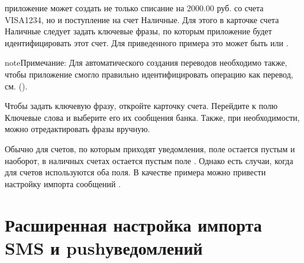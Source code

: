 \documentclass[a4paper,10pt,russian]{sphinxmanual}
\begin{document}
\sphinxAtStartPar
приложение может создать не только списание на 2000.00 руб. со счета VISA1234, но и поступление на счет Наличные. Для этого в карточке
счета Наличные следует задать ключевые фразы, по которым приложение будет идентифицировать этот счет. Для приведенного примера
это может быть  или .

\begin{sphinxadmonition}{note}{Примечание:}
\sphinxAtStartPar
Для автоматического создания переводов необходимо также, чтобы приложение смогло правильно идентифицировать операцию как перевод, см. {\hyperref[\detokenize{notifications:chapter-notifications}]{}} ().
\end{sphinxadmonition}

\sphinxAtStartPar
Чтобы задать ключевую фразу, откройте карточку счета. Перейдите к полю Ключевые слова и выберите его их сообщения банка. Также, при необходимости, можно отредактировать фразы вручную.

\noindent{}
\noindent{}
\noindent{}

\sphinxAtStartPar
Обычно для счетов, по которым приходят уведомления, поле  остается пустым и наоборот, в наличных счетах
остается пустым поле . Однако есть случаи, когда для счетов используются оба поля. В качестве примера можно привести настройку
импорта сообщений .

\sphinxstepscope


\chapter{Расширенная настройка импорта SMS и push\sphinxhyphen{}уведомлений}
\label{\detokenize{notifications:sms-push}}\label{\detokenize{notifications:chapter-notifications}}\label{\detokenize{notifications::doc}}
\end{document}
